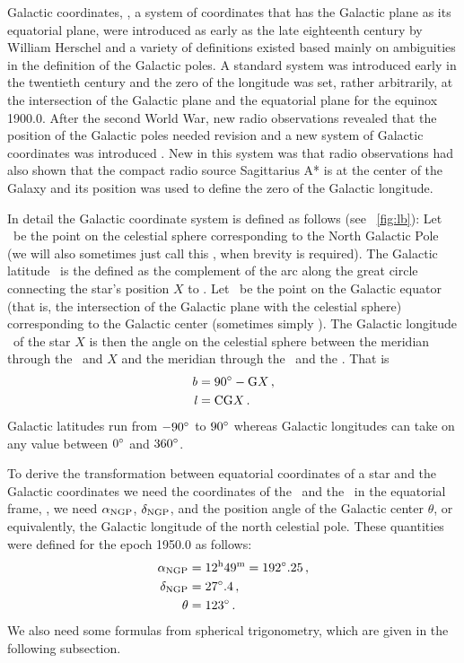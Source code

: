 Galactic coordinates, \ie, a system of coordinates that has the
Galactic plane as its equatorial plane, were introduced as early as
the late eighteenth century by William Herschel and a variety of
definitions existed based mainly on ambiguities in the definition of
the Galactic poles. A standard system was introduced early in the
twentieth century \citep{Ohlsson32a} and the zero of the longitude was
set, rather arbitrarily, at the intersection of the Galactic plane and
the equatorial plane for the equinox 1900.0. After the second World
War, new radio observations revealed that the position of the Galactic
poles needed revision and a new system of Galactic coordinates was
introduced \citep{1960MNRAS.121..123B}. New in this system was that
radio observations had also shown that the compact radio source
Sagittarius A* is at the center of the Galaxy and its position was
used to define the zero of the Galactic longitude.

In detail the Galactic coordinate system is defined as follows (see
\figurename~\ref{fig:lb}): Let \ngp\ be the point on the celestial
sphere corresponding to the North Galactic Pole (we will also
sometimes just call this \ngpg, when brevity is required). The
Galactic latitude \galb\ is the defined as the complement of the arc
along the great circle connecting the star's position $X$ to \ngp. Let
\gc\ be the point on the Galactic equator (that is, the intersection
of the Galactic plane with the celestial sphere) corresponding to the
Galactic center (sometimes simply \gcc). The Galactic longitude
\gall\ of the star $X$ is then the angle on the celestial sphere
between the meridian through the \ngp\ and $X$ and the meridian
through the \ngp\ and the \gc. That is
\begin{align}\label{eq:galcodef}
{\it b} &= 90^{\circ} - \textnormal{G} X \, ,\\
{\it l} &= \textnormal{C} \textnormal{G} X \, .
\end{align}
Galactic latitudes run from $-90^{\circ}$ to $90^{\circ}$ whereas Galactic
longitudes can take on any value between $0^{\circ}$ and $360^{\circ}$.

To derive the transformation between equatorial coordinates of a star
and the Galactic coordinates we need the coordinates of the \ngp\ and
the \gc\ in the equatorial frame, \ie, we need $\alpha_{\textnormal{NGP}}$, $\delta_{\textnormal{NGP}}$,
and the position angle of the Galactic center $\theta$, or
equivalently, the Galactic longitude of the north celestial
pole. These quantities were defined for the epoch 1950.0 as follows:
\citep{1960MNRAS.121..123B}
\begin{align}\label{eq:IAUNGPGC}
\alpha_{\textnormal{NGP}} &= 12^{\textnormal{h}}49^{\textnormal{m}} = 192^{\circ}.25\, ,\\
\delta_{\textnormal{NGP}} &= 27^{\circ}.4\, ,\\
\theta &= 123^{\circ}\, .
\end{align}
We also need some formulas from spherical trigonometry, which are
given in the following subsection.

